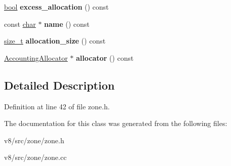 \begin{DoxyCompactItemize}
\mbox{\hyperlink{classbool}{bool}} {\bfseries excess\+\_\+allocation} () const
\item 
\mbox{\label{classv8_1_1internal_1_1Zone_a077f7ecccaf09830dab3a7ed05506942}} 
const \mbox{\hyperlink{classchar}{char}} $\ast$ {\bfseries name} () const
\item 
\mbox{\label{classv8_1_1internal_1_1Zone_a5598fd0d6fbe395c364a7cc5722433ee}} 
\mbox{\hyperlink{classsize__t}{size\+\_\+t}} {\bfseries allocation\+\_\+size} () const
\item 
\mbox{\label{classv8_1_1internal_1_1Zone_a0b20134756b6b3f740f016847fa207df}} 
\mbox{\hyperlink{classv8_1_1internal_1_1AccountingAllocator}{Accounting\+Allocator}} $\ast$ {\bfseries allocator} () const
\end{DoxyCompactItemize}


\subsection{Detailed Description}


Definition at line 42 of file zone.\+h.



The documentation for this class was generated from the following files\+:\begin{DoxyCompactItemize}
\item 
v8/src/zone/zone.\+h\item 
v8/src/zone/zone.\+cc\end{DoxyCompactItemize}
